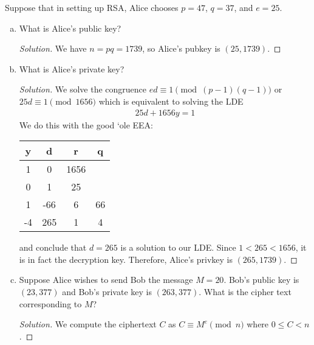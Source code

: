 \begin{recommended}
  Suppose that in setting up RSA, Alice chooses $p = 47$, $q = 37$, and $e = 25$.
\end{recommended}
\begin{enumerate}[(a)]
  \item What is Alice's public key?
        \begin{proof}[Solution]
          We have $n = pq = 1739$, so Alice's pubkey is $(25, 1739)$.
        \end{proof}
  \item What is Alice's private key?
        \begin{proof}[Solution]
          We solve the congruence $ed \equiv 1 \pmod{(p-1)(q-1)}$ or $25d \equiv 1 \pmod{1656}$
          which is equivalent to solving the LDE
          \begin{align*}
            25d + 1656y = 1
          \end{align*}
          We do this with the good `ole EEA\@:
          \begin{center}
            \begin{tabular}{C|C|C|C}
              y  & d   & r    & q  \\   & 0   & 1656      \\
              0  & 1   & 25        \\
              1  & -66 & 6    & 66 \\
              -4 & 265 & 1    & 4
            \end{tabular}
          \end{center}
          and conclude that $d=265$ is a solution to our LDE\@.
          Since $1 < 265 < 1656$, it is in fact the decryption key.
          Therefore, Alice's privkey is $(265,1739)$.
        \end{proof}
  \item Suppose Alice wishes to send Bob the message $M = 20$.
        Bob's public key is $(23, 377)$ and Bob’s private key is $(263, 377)$.
        What is the cipher text corresponding to $M$?
        \begin{proof}[Solution]
          We compute the ciphertext $C$ as $C \equiv M^e \pmod{n}$ where $0 \leq C < n$.


\end{proof}
\end{enumerate}
